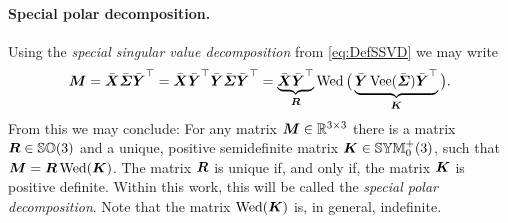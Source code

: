 \paragraph{Special polar decomposition.}
Using the \textit{special singular value decomposition} from \eqref{eq:DefSSVD} we may write
\begin{align}
 \boldsymbol{M} = \bar{\boldsymbol{X}} \bar{\boldsymbol{\varSigma}} \bar{\boldsymbol{Y}}^\top
 = \bar{\boldsymbol{X}} \bar{\boldsymbol{Y}}^\top \bar{\boldsymbol{Y}} \bar{\boldsymbol{\varSigma}} \bar{\boldsymbol{Y}}^\top
 = \underbrace{\bar{\boldsymbol{X}} \bar{\boldsymbol{Y}}^\top}_{\boldsymbol{R}} \operatorname{Wed}\big(\underbrace{\bar{\boldsymbol{Y}} \operatorname{Vee}(\bar{\boldsymbol{\varSigma}}) \bar{\boldsymbol{Y}}^\top}_{\boldsymbol{K}}\big).
\end{align}
From this we may conclude:
For any matrix $\boldsymbol{M} \in\mathbb{R}^{3\times3}$ there is a matrix $\boldsymbol{R} \in \mathbb{SO}(3)$ and a unique, positive semidefinite matrix $\boldsymbol{K} \in \mathbb{SYM}^{+}_{0}(3)$, such that $\boldsymbol{M} = \boldsymbol{R} \operatorname{Wed}(\boldsymbol{K})$.
The matrix $\boldsymbol{R}$ is unique if, and only if, the matrix $\boldsymbol{K}$ is positive definite.
Within this work, this will be called the \textit{special polar decomposition}.
Note that the matrix $\operatorname{Wed}(\boldsymbol{K})$ is, in general, indefinite.


